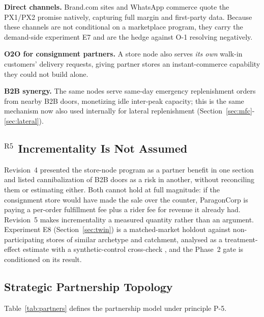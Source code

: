 \documentclass[10pt,twocolumn,letterpaper]{article}
\theoremstyle{definition}
\begin{document}
\textbf{Direct channels.} Brand.com sites and WhatsApp commerce quote the PX1/PX2 promise natively, capturing full margin and first-party data. Because these channels are not conditional on a marketplace program, they carry the demand-side experiment E7 and are the hedge against O-1 resolving negatively.

\textbf{O2O for consignment partners.} A store node also serves \emph{its own} walk-in customers' delivery requests, giving partner stores an instant-commerce capability they could not build alone.

\textbf{B2B synergy.} The same nodes serve same-day emergency replenishment orders from nearby B2B doors, monetizing idle inter-peak capacity; this is the same mechanism now also used internally for lateral replenishment (Section~\ref{sec:mfc}-\ref{sec:lateral}).

\subsection{$^{\mathrm{R5}}$ Incrementality Is Not Assumed}
Revision~4 presented the store-node program as a partner benefit in one section and listed cannibalization of B2B doors as a risk in another, without reconciling them or estimating either. Both cannot hold at full magnitude: if the consignment store would have made the sale over the counter, ParagonCorp is paying a per-order fulfillment fee plus a rider fee for revenue it already had. Revision~5 makes incrementality a measured quantity rather than an argument. Experiment E8 (Section~\ref{sec:twin}) is a matched-market holdout against non-participating stores of similar archetype and catchment, analysed as a treatment-effect estimate \cite{imbens2015} with a synthetic-control cross-check \cite{abadie2010}, and the Phase~2 gate is conditioned on its result.

\subsection{Strategic Partnership Topology}
Table~\ref{tab:partners} defines the partnership model under principle P-5.
\end{document}
